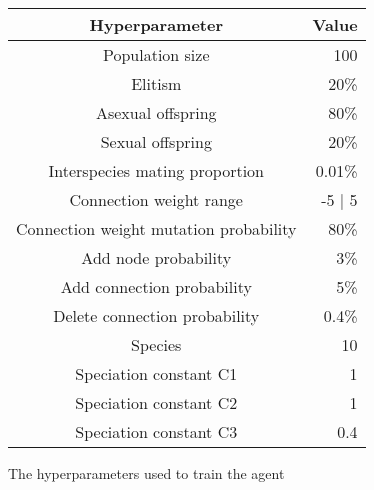 
\begin{figure}[H]
{\centering
	\begin{tabular}{| c | r |}
		\hline
	
		\textbf{Hyperparameter} & \textbf{Value} \\ \hline
		Population size & 100 \\ \hline
		Elitism & 20\% \\ \hline
		Asexual offspring & 80\% \\ \hline
		Sexual offspring & 20\% \\ \hline
		Interspecies mating proportion & 0.01\% \\ \hline
		Connection weight range & -5 | 5 \\ \hline
		Connection weight mutation probability & 80\% \\ \hline
		Add node probability & 3\% \\ \hline
		Add connection probability & 5\% \\ \hline
		Delete connection probability & 0.4\% \\ \hline
		Species & 10 \\ \hline
		Speciation constant C1 & 1 \\ \hline
		Speciation constant C2 & 1 \\ \hline
		Speciation constant C3 & 0.4 \\ \hline
		
	
	\end{tabular}
	\caption{The hyperparameters used to train the agent}
	\label{fig:neat-hyper}
}
\end{figure}
